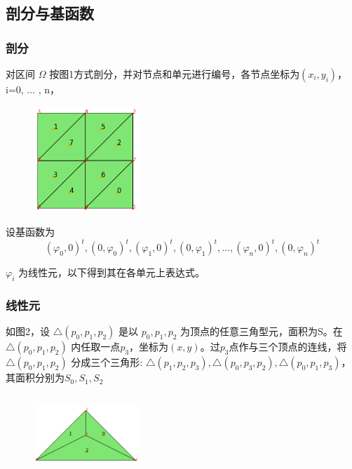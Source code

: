 \documentclass[a4paper,UTF8,titlepage]{ctexart}
\begin{document}
\subsection{剖分与基函数}

\subsubsection{剖分}

对区间 $\Omega$ 按图1方式剖分，并对节点和单元进行编号，各节点坐标为$(x_i,y_i)$， i=0, ... , n，

\begin{figure}[hbt]
	\centering
	\includegraphics[height=4cm,width=4cm]{../image/subdivsion.png}
	\caption{}
\end{figure}

设基函数为 
$$ 
(\varphi_0,0)^t, (0,\varphi_0)^t, (\varphi_1,0)^t, (0,\varphi_1)^t, ... , (\varphi_n,0)^t, (0,\varphi_n)^t 
$$

$\varphi_i$ 为线性元，以下得到其在各单元上表达式。 

\subsubsection{线性元}

如图2，设 $ \bigtriangleup(p_0,p_1,p_2) $ 是以 $p_0,p_1,p_2$ 为顶点的任意三角型元，面积为S。在 $ \bigtriangleup (p_0,p_1,p_2) $ 内任取一点$p_3$，坐标为$(x,y)$。过$p_3$点作与三个顶点的连线，将 $ \bigtriangleup(p_0,p_1,p_2) $ 分成三个三角形: $ \bigtriangleup(p_1,p_2,p_3), \bigtriangleup(p_0,p_3,p_2), \bigtriangleup(p_0,p_1,p_3) $，其面积分别为$S_0,S_1,S_2$

\begin{figure}[hbt]
	\centering
	\includegraphics[height=3cm,width=4cm]{../image/TriangleElement.png}
	\caption{}
	\label{SampleOfDatasets}
\end{figure}
\end{document}
